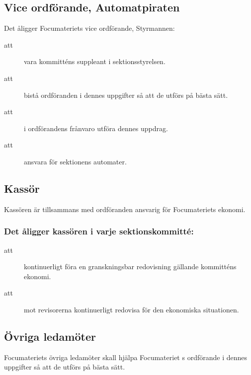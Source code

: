 \documentclass[a4paper]{article}
\begin{document}
\begin{foreningenv}{\forening{}}
    
    \subsection{Vice ordförande, Automatpiraten}
    Det åligger Focumateriets vice ordförande, Styrmannen:
    \begin{description}
        \item[att] vara kommitténs suppleant i sektionsstyrelsen.
        \item[att] bistå ordföranden i dennes uppgifter så att de utförs på bästa sätt.
        \item[att] i ordförandens frånvaro utföra dennes uppdrag.
        \item[att] ansvara för sektionens automater.
    \end{description}
    
    \subsection{Kassör}
        Kassören är tillsammans med ordföranden ansvarig för Focumateriets ekonomi.
    
    \subsubsection{Det åligger kassören i varje sektionskommitté:}
    \begin{description}
        \item[att] kontinuerligt föra en granskningsbar redovisning gällande kommitténs ekonomi.
        \item[att] mot revisorerna kontinuerligt redovisa för den ekonomiska situationen.
    \end{description}
    
    
    \subsection{Övriga ledamöter}
    Focumateriets övriga ledamöter skall hjälpa Focumateriet s ordförande i dennes uppgifter så att de utförs på bästa sätt.
\end{foreningenv}
\end{document}
